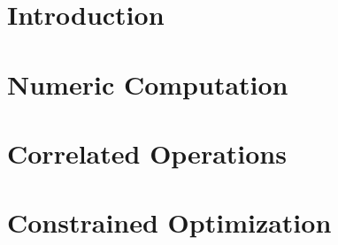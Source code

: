 \documentclass[12pt,letterpaper,oneside]{book}
\makeatletter
\theoremstyle{plain}
\theoremstyle{definition}
\theoremstyle{remark}
\numberwithin{theorem}{chapter}
\def\startabstractpage#1{%
 \newpage
 \setcounter{page}{1}   %
 \addcontentsline{toc}{chapter}{ABSTRACT}
 \@restonecolfalse\if@twocolumn\@restonecoltrue\onecolumn\fi
 \hbox{ }
 \twoinmar
 \centerline{ABSTRACT}
 \vspace{0.4in}
 \noindent #1
 \vspace{0.25in}\\
}
\makeatother
\begin{document}

\makeatletter
\if@twoside \setcounter{page}{4} \else \setcounter{page}{1} \fi
\makeatother


\tableofcontents     %
\listoftables        %
\listoffigures       %

%


\chapter{Introduction}

\chapter{Numeric Computation}

\chapter{Correlated Operations}

\chapter{Constrained Optimization}

\end{document}
